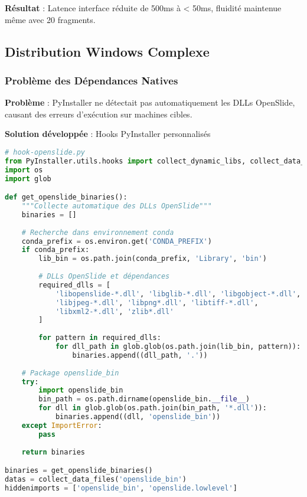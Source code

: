 \documentclass[12pt,a4paper]{report}
\begin{document}
\textbf{Résultat} : Latence interface réduite de 500ms à < 50ms, fluidité maintenue même avec 20 fragments.

\subsection{Distribution Windows Complexe}

\subsubsection{Problème des Dépendances Natives}

\textbf{Problème} : PyInstaller ne détectait pas automatiquement les DLLs OpenSlide, causant des erreurs d'exécution sur machines cibles.

\textbf{Solution développée} : Hooks PyInstaller personnalisés

\begin{lstlisting}[language=Python]
# hook-openslide.py
from PyInstaller.utils.hooks import collect_dynamic_libs, collect_data_files
import os
import glob

def get_openslide_binaries():
    """Collecte automatique des DLLs OpenSlide"""
    binaries = []
    
    # Recherche dans environnement conda
    conda_prefix = os.environ.get('CONDA_PREFIX')
    if conda_prefix:
        lib_bin = os.path.join(conda_prefix, 'Library', 'bin')
        
        # DLLs OpenSlide et dépendances
        required_dlls = [
            'libopenslide-*.dll', 'libglib-*.dll', 'libgobject-*.dll',
            'libjpeg-*.dll', 'libpng*.dll', 'libtiff-*.dll',
            'libxml2-*.dll', 'zlib*.dll'
        ]
        
        for pattern in required_dlls:
            for dll_path in glob.glob(os.path.join(lib_bin, pattern)):
                binaries.append((dll_path, '.'))
    
    # Package openslide_bin
    try:
        import openslide_bin
        bin_path = os.path.dirname(openslide_bin.__file__)
        for dll in glob.glob(os.path.join(bin_path, '*.dll')):
            binaries.append((dll, 'openslide_bin'))
    except ImportError:
        pass
    
    return binaries

binaries = get_openslide_binaries()
datas = collect_data_files('openslide_bin')
hiddenimports = ['openslide_bin', 'openslide.lowlevel']
\end{lstlisting}
\end{document}
